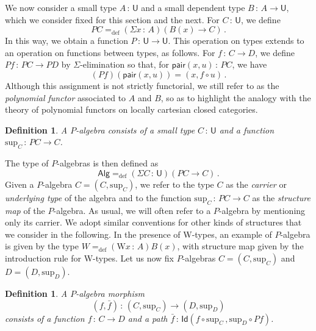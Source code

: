 \documentclass[10pt,a4paper,oneside,reqno]{amsart}
\numberwithin{equation}{section}
\theoremstyle{mythm}
\theoremstyle{mydef}
\newtheorem{definition}[theorem]{Definition}
\theoremstyle{myrmk}
\newcommand{\defeq}{=_{\mathrm{def}}}
\newcommand{\co}{\,{:}\,}
\newcommand{\Id}{\mathsf{Id}}
\newcommand{\pair}{\mathsf{pair}}
\newcommand{\W}{\mathrm{W}}
\newcommand{\U}{\mathsf{U}}
\newcommand{\Palg}{\mathsf{Alg}}
\renewcommand{\sup}{\mathrm{sup}}
\begin{document}
We now consider a small type $A \co \U$ and a small dependent type $B \co A \to \U$, which we consider
fixed for this section and the next. For $C \co \U$,
we define
\[
PC \defeq (\Sigma x \co A) (B(x) \to C) \, .
\]
In this way, we obtain a function $P \co \U \to \U$. This operation on types extends to an operation on functions between 
 types, as follows. For $f \co C \to D$, we define $P f  \co PC \to PD$ by $\Sigma$-elimination
so that, for $\pair(x, u) \co PC$, we have 
\[
(Pf )( \pair(x, u)) = (x,f\circ u) \, .
\] 
Although this assignment is not strictly functorial, we still refer to  as the \emph{polynomial functor} associated to $A$ and $B$, so as to highlight the analogy with the theory of polynomial functors on locally cartesian closed categories.

\begin{definition} A \emph{$P$-algebra} consists of a small type $C \co \U$ and a function $\sup_C \co PC \to C$. 
\end{definition}

\smallskip

 The type of $P$-algebras is then defined as 
 \[
 \Palg  \defeq (\Sigma C \co \U) (PC \to C) \, .
 \]
 Given a $P$-algebra $C = (C, \sup_C)$,
 we refer to the type $C$ as the \emph{carrier} or \emph{underlying type} of the algebra and to the function $\sup_C \co PC\to C$ as the \emph{structure map} of the $P$-algebra. 
 As usual,  we will often refer to a 
 $P$-algebra by mentioning only its carrier. We adopt similar conventions for other kinds of structures that we consider
 in the following.  In the
 presence of W-types, an example of $P$-algebra is given by the type $W \defeq (\W x\co A)B(x)$, with structure map given by the introduction rule for W-types. 
Let us now fix $P$-algebras $C = (C, \sup_C)$ and $D = (D, \sup_D)$. 

\begin{definition} A \emph{$P$-algebra morphism}
\[
(f, \bar{f}) \co (C, \sup_C) \rightarrow (D, \sup_D)
\]
consists of a function $f \co C \rightarrow D$ and a path $\bar{f} \co \Id( f \circ \sup_C \, ,  \sup_{D} \circ P f )$.
\end{definition}
\end{document}

